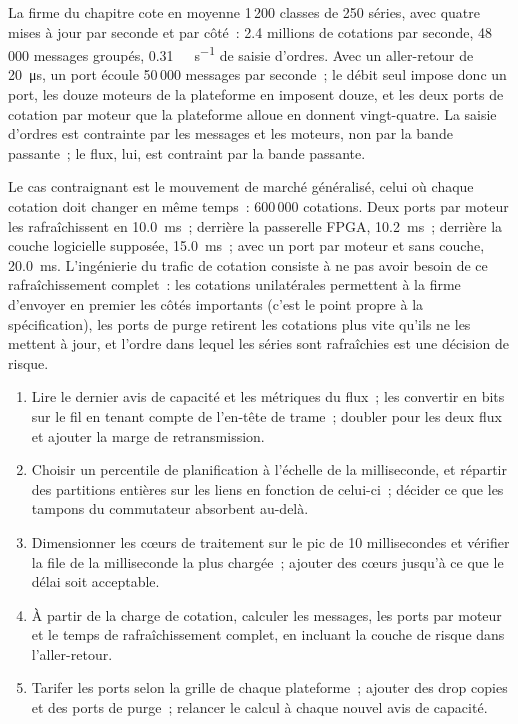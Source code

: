 La firme du chapitre cote en moyenne 1\,200 classes de 250 séries, avec quatre mises à jour par seconde et par côté~: 2.4 millions de cotations par seconde,
48\,000 messages groupés, \qty{0.31}{\giga\bit\per\second} de saisie d'ordres. Avec un aller-retour de \qty{20}{\micro\second}, un port écoule
50\,000 messages par seconde~; le débit seul impose donc un port, les douze moteurs de la plateforme en imposent douze, et les deux ports de cotation
par moteur que la plateforme alloue en donnent vingt-quatre. La saisie d'ordres est contrainte par les messages et les moteurs, non par la bande passante~; le flux, lui, est
contraint par la bande passante.

Le cas contraignant est le mouvement de marché généralisé, celui où chaque cotation doit changer en même temps~: 600\,000 cotations. Deux ports par moteur les rafraîchissent
en \qty{10.0}{\milli\second}~; derrière la passerelle FPGA, \qty{10.2}{\milli\second}~; derrière la couche logicielle supposée,
\qty{15.0}{\milli\second}~; avec un port par moteur et sans couche, \qty{20.0}{\milli\second}. L'ingénierie du trafic de cotation consiste à
ne pas avoir besoin de ce rafraîchissement complet~: les cotations unilatérales permettent à la firme d'envoyer en premier les côtés importants (c'est le point
propre à la spécification), les ports de purge retirent les cotations plus vite qu'ils ne les mettent à jour, et l'ordre dans lequel les séries sont rafraîchies est une décision de risque.

\begin{method}\label{met:nw:equities-and-options-connectivity:size}
\begin{enumerate}
\item Lire le dernier avis de capacité et les métriques du flux~; les convertir en bits sur le fil en tenant compte de l'en-tête de trame~; doubler pour les deux
  flux et ajouter la marge de retransmission.
\item Choisir un percentile de planification à l'échelle de la milliseconde, et répartir des partitions entières sur les liens en fonction de celui-ci~; décider ce que les
  tampons du commutateur absorbent au-delà.
\item Dimensionner les cœurs de traitement sur le pic de 10 millisecondes et vérifier la file de la milliseconde la plus chargée~; ajouter des cœurs jusqu'à ce que le délai soit
  acceptable.
\item À partir de la charge de cotation, calculer les messages, les ports par moteur et le temps de rafraîchissement complet, en incluant la couche de risque
  dans l'aller-retour.
\item Tarifer les ports selon la grille de chaque plateforme~; ajouter des drop copies et des ports de purge~; relancer le calcul à chaque nouvel avis de capacité.
\end{enumerate}
\end{method}

